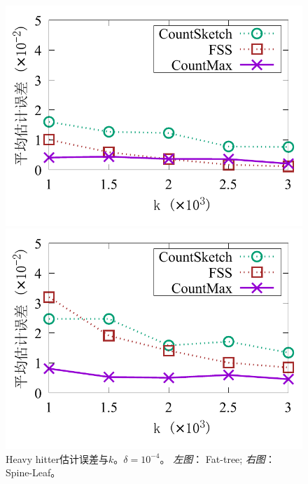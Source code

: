 \begin{figure}[ht]
	\centering
	\begin{minipage}[t]{0.49\linewidth}
		\centering
		\includegraphics[width=\linewidth]{fig/ft_k_hh_10000.pdf}
	\end{minipage}\vspace{-0.6em}%
	\begin{minipage}[t]{0.49\linewidth}
		\centering
		\includegraphics[width=\linewidth]{fig/hy_k_hh_10000.pdf}
	\end{minipage}\vspace{-0.6em}%
	\caption{\textnormal{Heavy hitter估计误差与$k$。$\delta=10^{-4}$。 \textit{左图}： Fat-tree; \textit{右图}： Spine-Leaf。}}
	\label{fig:hh,k,10000}
\end{figure}

